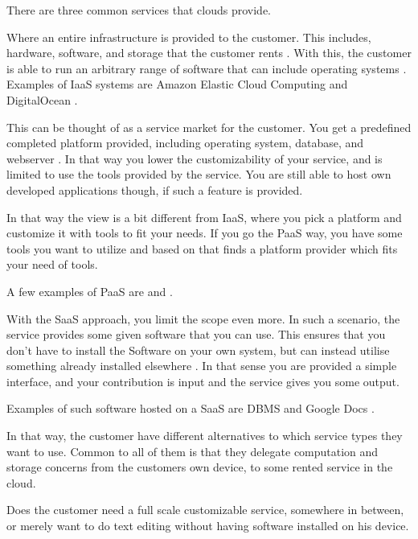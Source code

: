There are three common services that clouds provide.
\begin{description}[style=nextline]
\item[Infrastructure as a Service (IaaS)]
Where an entire infrastructure is provided to the customer.
This includes, hardware, software, and storage that the customer rents \citep{article:mobilecloudreviewinderkilde}.
With this, the customer is able to run an arbitrary range of software that can include operating systems \citep{misc:indersuverymcc}.
Examples of IaaS systems are Amazon Elastic Cloud Computing \citep{misc:amazonelastic} and DigitalOcean \citep{misc:digitalocean}.

\item[Platform as a Service (PaaS)]
This can be thought of as a service market for the customer.
You get a predefined completed platform provided, including operating system, database, and webserver \cite{article:mobilecloudreviewinderkilde}.
In that way you lower the customizability of your service, and is limited to use the tools provided by the service.
You are still able to host own developed applications though, if such a feature is provided.

In that way the view is a bit different from IaaS, where you pick a platform and customize it with tools to fit your needs.
If you go the PaaS way, you have some tools you want to utilize and based on that finds a platform provider which fits your need of tools.

A few examples of PaaS are \citet{misc:appFog} and \citet{misc:heroku}.

\item[Software as a Service (SaaS)]
With the SaaS approach, you limit the scope even more.
In such a scenario, the service provides some given software that you can use.
This ensures that you don't have to install the Software on your own system, but can instead utilise something already installed elsewhere \citep{article:mobilecloudreviewinderkilde,misc:indersuverymcc}.
In that sense you are provided a simple interface, and your contribution is input and the service gives you some output.

Examples of such software hosted on a SaaS are DBMS and Google Docs \citep{article:mobilecloudreviewinderkildesecurity}. 
\end{description}
In that way, the customer have different alternatives to which service types they want to use.
Common to all of them is that they delegate computation and storage concerns from the customers own device, to some rented service in the cloud.

Does the customer need a full scale customizable service, somewhere in between, or merely want to do text editing without having software installed on his device.
